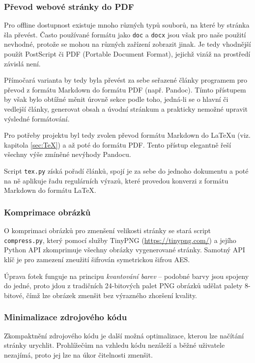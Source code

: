 \documentclass[a4paper, 12pt]{article}
\begin{document}
  \subsubsection{Převod webové stránky do PDF} \label{sec:Převod webové stránky do PDF}
  Pro offline dostupnost existuje mnoho různých typů souborů, na které by stránka šla převést. Často používané formátu jako \texttt{doc} a \texttt{docx} jsou však pro naše použití nevhodné, protože se mohou na různých zařízení zobrazit jinak. Je tedy vhodnější použít PostScript či PDF (Portable Document Format), jejichž vizáž na prostředí závislá není\cite{history-of-pdf}.

  Přímočará varianta by tedy byla převést za sebe seřazené články programem pro převod z formátu Markdown do formátu PDF (např. Pandoc). Tímto přístupem by však bylo obtížné měnit úrovně sekce podle toho, jedná-li se o hlavní či vedlejší články, generovat obsah a úvodní stránkum a prakticky nemožné upravit výsledné formátování.

  Pro potřeby projektu byl tedy zvolen převod formátu Markdown do \LaTeX u (viz. kapitola \ref{sec:TeX}) a až poté do formátu PDF. Tento přístup elegantně řeší všechny výše zmíněné nevýhody Pandocu.

  Script \texttt{tex.py} získá pořadí článků, spojí je za sebe do jednoho dokumentu a poté na ně aplikuje řadu regulárních výrazů, které provedou konverzi z formátu Markdown do formátu \LaTeX.



  \subsubsection{Komprimace obrázků}
  O komprimaci obrázků pro zmenšení velikosti stránky se stará script \texttt{compress.py}, který pomocí služby TinyPNG (\url{https://tinypng.com/}) a jejího Python API zkomprimuje všechny obrázky vygenerované stránky. Samotný API klíč je pro zamezení zneužití šifrován symetrickou šifrou AES.

  Úprava fotek funguje na principu \emph{kvantování barev} -- podobné barvy jsou spojeny do jedné, proto jdou z tradičních 24-bitových palet PNG obrázků udělat palety 8-bitové, čímž lze obrázek zmenšit bez výrazného zhoršení kvality.


  \subsubsection{Minimalizace zdrojového kódu}
  Zkompaktnění zdrojového kódu je další možná optimalizace, kterou lze načítání stránky urychlit. Prohlížečům na vzhledu kódu nezáleží a běžné uživatele nezajímá, proto jej lze na úkor čitelnosti zmenšit.
\end{document}
